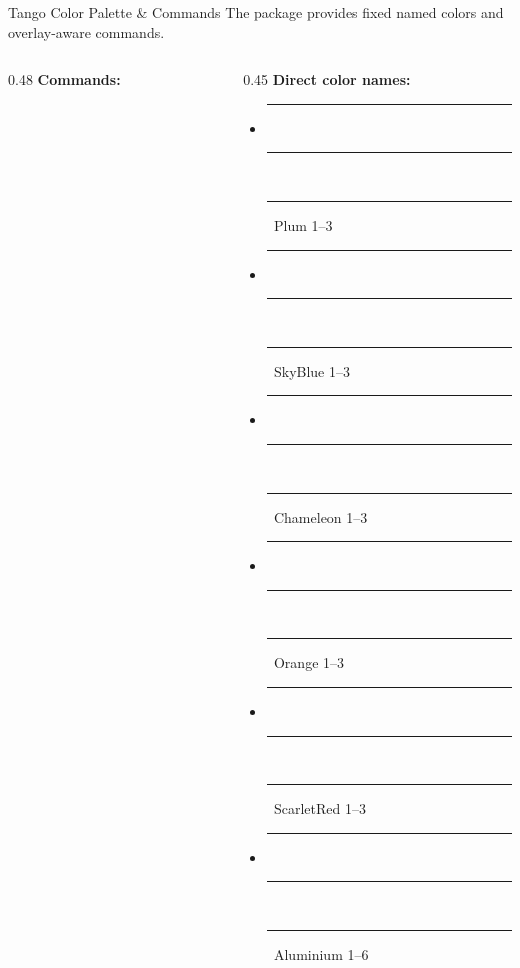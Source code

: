 \documentclass[presentation, aspectratio=169]{beamer}
\begin{document}
\begin{frame}{Tango Color Palette \& Commands}
  The  package provides fixed named colors and overlay-aware commands.

  \vspace{0.3em}
  \begin{columns}
    \begin{column}{0.48\columnwidth}
      \textbf{Commands:} \\[0.4em]
       \quad {} \quad {}\\
       \quad {} \quad {}\\
       \quad {} \quad {}\\
       \quad {} \quad {}\\
       \quad {} \quad {}\\
       \quad {} \quad {}\\
       \quad {} \quad {}\\
       \quad {} \quad {}
    \end{column}
    \begin{column}{0.45\columnwidth}
      \textbf{Direct color names:}\\[0.4em]
      \begin{itemize}
        \item \textcolor{Plum1}{\rule{0.8em}{0.8em}}~\textcolor{Plum2}{\rule{0.8em}{0.8em}}~\textcolor{Plum3}{\rule{0.8em}{0.8em}}~Plum 1--3
        \item \textcolor{SkyBlue1}{\rule{0.8em}{0.8em}}~\textcolor{SkyBlue2}{\rule{0.8em}{0.8em}}~\textcolor{SkyBlue3}{\rule{0.8em}{0.8em}}~SkyBlue 1--3
        \item \textcolor{Chameleon1}{\rule{0.8em}{0.8em}}~\textcolor{Chameleon2}{\rule{0.8em}{0.8em}}~\textcolor{Chameleon3}{\rule{0.8em}{0.8em}}~Chameleon 1--3
        \item \textcolor{Orange1}{\rule{0.8em}{0.8em}}~\textcolor{Orange2}{\rule{0.8em}{0.8em}}~\textcolor{Orange3}{\rule{0.8em}{0.8em}}~Orange 1--3
        \item \textcolor{ScarletRed1}{\rule{0.8em}{0.8em}}~\textcolor{ScarletRed2}{\rule{0.8em}{0.8em}}~\textcolor{ScarletRed3}{\rule{0.8em}{0.8em}}~ScarletRed 1--3
        \item \textcolor{Aluminium1}{\rule{0.8em}{0.8em}}~\textcolor{Aluminium3}{\rule{0.8em}{0.8em}}~\textcolor{Aluminium6}{\rule{0.8em}{0.8em}}~Aluminium 1--6
      \end{itemize}
    \end{column}
  \end{columns}
\end{frame}
\end{document}

